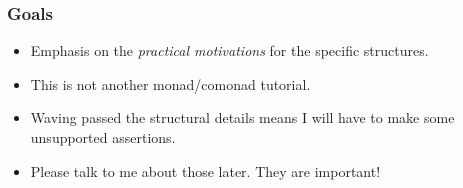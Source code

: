 \begin{frame}
\frametitle{Goals}
\begin{itemize}
\item<1> Emphasis on the \emph{practical motivations} for the specific structures.
\item<2> This is not another monad/comonad tutorial.
\item<3> Waving passed the structural details means I will have to make some unsupported assertions.
\item<4> Please talk to me about those later. They are important!
\end{itemize}
\end{frame}
